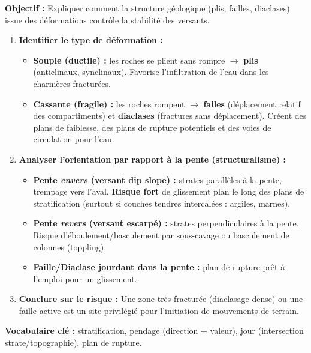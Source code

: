 \documentclass[11pt]{article}
\newcommand{\cle}[1]{{\popxbold\color{popdark}#1}}
\begin{document}
\begin{methode}
    \textbf{Objectif :} Expliquer comment la structure géologique (plis, failles, diaclases) issue des déformations contrôle la stabilité des versants.
    \begin{enumerate}
        \item \textbf{Identifier le type de déformation :}
            \begin{itemize}
                \item \textbf{Souple (ductile) :} les roches se plient sans rompre $\rightarrow$ \textbf{plis} (anticlinaux, synclinaux). Favorise l'infiltration de l'eau dans les charnières fracturées.
                \item \textbf{Cassante (fragile) :} les roches rompent $\rightarrow$ \textbf{failes} (déplacement relatif des compartiments) et \textbf{diaclases} (fractures sans déplacement). Créent des plans de faiblesse, des plans de rupture potentiels et des voies de circulation pour l'eau.
            \end{itemize}
        \item \textbf{Analyser l'orientation par rapport à la pente (structuralisme) :}
            \begin{itemize}
                \item \textbf{Pente \emph{envers} (versant dip slope) :} strates parallèles à la pente, trempage vers l'aval. \textbf{Risque fort} de glissement plan le long des plans de stratification (surtout si couches tendres intercalées : argiles, marnes).
                \item \textbf{Pente \emph{revers} (versant escarpé) :} strates perpendiculaires à la pente. Risque d'éboulement/basculement par sous-cavage ou basculement de colonnes (toppling).
                \item \textbf{Faille/Diaclase jourdant dans la pente :} plan de rupture prêt à l'emploi pour un glissement.
            \end{itemize}
        \item \textbf{Conclure sur le risque :} Une zone très fracturée (diaclasage dense) ou une faille active est un site privilégié pour l'initiation de mouvements de terrain.
    \end{enumerate}
    \textbf{Vocabulaire clé :} \cle{stratification}, \cle{pendage} (direction + valeur), \cle{jour} (intersection strate/topographie), \cle{plan de rupture}.
\end{methode}
\end{document}
